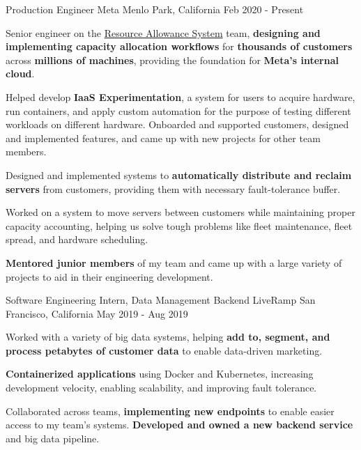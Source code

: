 

\begin{cventries}


\cventry
{Production Engineer}
{\acvHeaderIconSep Meta}
{Menlo Park, California}
{Feb 2020 - Present}
{
\begin{cvitems}
\item Senior engineer on the \href{https://dl.acm.org/doi/10.1145/3477132.3483578}{Resource Allowance System} team, \textbf{designing and implementing capacity allocation workflows} for \textbf{thousands of customers} across \textbf{millions of machines}, providing the foundation for \textbf{Meta's internal cloud}. 
\item Helped develop \textbf{IaaS Experimentation}, a system for users to acquire hardware, run containers, and apply custom automation for the purpose of testing different workloads on different hardware. Onboarded and supported customers, designed and implemented features, and came up with new projects for other team members. 
\item Designed and implemented systems to \textbf{automatically distribute and reclaim servers} from customers, providing them with necessary fault-tolerance buffer. 
\item Worked on a system to move servers between customers while maintaining proper capacity accounting, helping us solve tough problems like fleet maintenance, fleet spread, and hardware scheduling. 
\item \textbf{Mentored junior members} of my team and came up with a large variety of projects to aid in their engineering development.
\end{cvitems}
}


    \cventry
      {Software Engineering Intern, Data Management Backend}
      {LiveRamp}
      {San Francisco, California}
      {May 2019 - Aug 2019}
      {
        \begin{cvitems}
          \item Worked with a variety of big data systems, helping \textbf{add to, segment, and process petabytes of customer data} to enable data-driven marketing.
          \item \textbf{Containerized applications} using Docker and Kubernetes, increasing development velocity, enabling scalability, and improving fault tolerance.         
          \item Collaborated across teams, \textbf{implementing new endpoints} to enable easier access to my team's systems. \textbf{Developed and owned a new backend service} and big data pipeline.
        \end{cvitems}
      }


\end{cventries}
